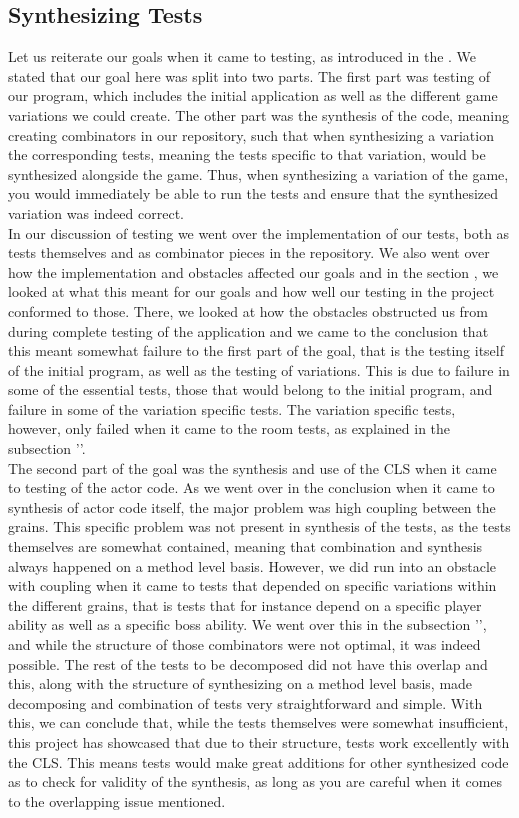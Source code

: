 \subsection{Synthesizing Tests}
Let us reiterate our goals when it came to testing, as introduced in the . We stated that our goal here was split into two parts. The first part was testing of our program, which includes the initial application as well as the different game variations we could create. The other part was the synthesis of the code, meaning creating combinators in our repository, such that when synthesizing a variation the corresponding tests, meaning the tests specific to that variation, would be synthesized alongside the game. Thus, when synthesizing a variation of the game, you would immediately be able to run the tests and ensure that the synthesized variation was indeed correct. \\
In our discussion of testing we went over the implementation of our tests, both as tests themselves and as combinator pieces in the repository. We also went over how the implementation and obstacles affected our goals and in the section , we looked at what this meant for our goals and how well our testing in the project conformed to those. There, we looked at how the obstacles obstructed us from during complete testing of the application and we came to the conclusion that this meant somewhat failure to the first part of the goal, that is the testing itself of the initial program, as well as the testing of variations. This is due to failure in some of the essential tests, those that would belong to the initial program, and failure in some of the variation specific tests. The variation specific tests, however, only failed when it came to the room tests, as explained in the subsection ''. \\
The second part of the goal was the synthesis and use of the CLS when it came to testing of the actor code. As we went over in the conclusion when it came to synthesis of actor code itself, the major problem was high coupling between the grains. This specific problem was not present in synthesis of the tests, as the tests themselves are somewhat contained, meaning that combination and synthesis always happened on a method level basis. However, we did run into an obstacle with coupling when it came to tests that depended on specific variations within the different grains, that is tests that for instance depend on a specific player ability as well as a specific boss ability. We went over this in the subsection '', and while the structure of those combinators were not optimal, it was indeed possible. The rest of the tests to be decomposed did not have this overlap and this, along with the structure of synthesizing on a method level basis, made decomposing and combination of tests very straightforward and simple. With this, we can conclude that, while the tests themselves were somewhat insufficient, this project has showcased that due to their structure, tests work excellently with the CLS. This means tests would make great additions for other synthesized code as to check for validity of the synthesis, as long as you are careful when it comes to the overlapping issue mentioned.

